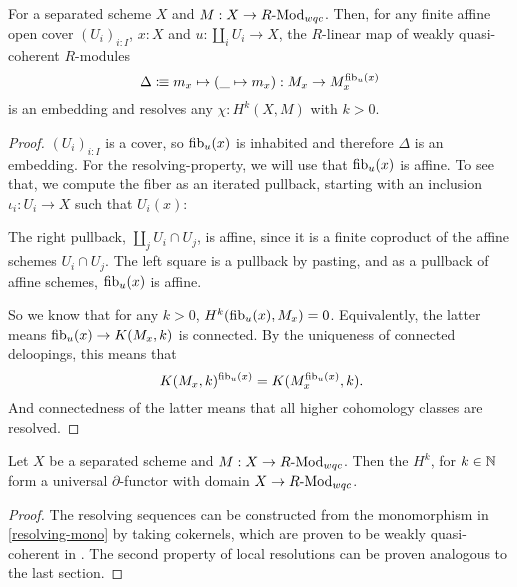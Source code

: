 \begin{remark}
  \label{resolving-mono}
  For a separated scheme $X$ and $M:X\to R\text{-}\mathrm{Mod}_{wqc}$.
  Then, for any finite affine open cover $(U_i)_{i:I}$, $x:X$
  and $u:\coprod_i U_i\to X$,
  the $R$-linear map of weakly quasi-coherent $R$-modules
  \[ \Delta\vcentcolon\mspace{-1.2mu}\equiv m_x\mapsto (\_\mapsto m_x):M_x\to M_x^{\mathrm{fib}_u(x)}\]
  is an embedding and resolves any $\chi:H^k(X,M)$ with $k>0$.
\end{remark}

\begin{proof}
  $(U_i)_{i:I}$ is a cover, so $\mathrm{fib}_u(x)$ is inhabited and therefore $\Delta$ is an embedding.
  For the resolving-property, we will use that $\mathrm{fib}_u(x)$ is affine.
  To see that,
  we compute the fiber as an iterated pullback,
  starting with an inclusion $\iota_i:U_i\to X$ such that $U_i(x)$:
  \begin{center}
  \end{center}
  The right pullback, $\coprod_j U_i\cap U_j$, is affine, since it is a finite coproduct of the affine schemes $U_i\cap U_j$.
  The left square is a pullback by pasting, and as a pullback of affine schemes, $\mathrm{fib}_u(x)$ is affine.

  So we know that for any $k>0$, $H^k(\mathrm{fib}_u(x),M_x)=0$.
  Equivalently, the latter means $\mathrm{fib}_u(x)\to K(M_x,k)$ is connected.
  By the uniqueness of connected deloopings, this means that
  \[
    K(M_x,k)^{\fib_u(x)} = K(M_x^{\fib_u(x)},k)
    \rlap{.}
  \]
  And connectedness of the latter means that all higher cohomology classes are resolved.
\end{proof}

\begin{theorem}
  Let $X$ be a separated scheme and $M:X\to R\text{-}\mathrm{Mod}_{wqc}$.
  Then the $H^k$, for $k\in\mathbb{N}$ form a universal $\partial$-functor with domain $X\to R\text{-}\mathrm{Mod}_{wqc}$.
\end{theorem}

\begin{proof}
  The resolving sequences can be constructed from the monomorphism in \cref{resolving-mono}
  by taking cokernels, which are proven to be weakly quasi-coherent in \cite{draft}.
  The second property of local resolutions can be proven analogous to the last section.
\end{proof}


